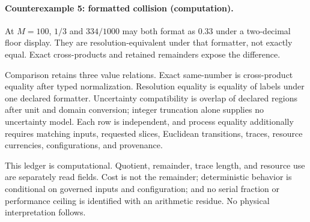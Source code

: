 \paragraph{Counterexample 5: formatted collision (computation).}
At \(M=100\), \(1/3\) and \(334/1000\) may both format as \(0.33\) under a two-decimal floor display.  They are
resolution-equivalent under that formatter, not exactly equal.  Exact cross-products and retained remainders expose
the difference.

Comparison retains three value relations.  Exact same-number is cross-product equality after typed normalization.
Resolution equality is equality of labels under one declared formatter.  Uncertainty compatibility is overlap of
declared regions after unit and domain conversion; integer truncation alone supplies no uncertainty model.  Each row
is independent, and process equality additionally requires matching inputs, requested slices, Euclidean transitions,
traces, resource currencies, configurations, and provenance.

This ledger is computational.  Quotient, remainder, trace length, and resource use are separately read fields.  Cost
is not the remainder; deterministic behavior is conditional on governed inputs and configuration; and no serial
fraction or performance ceiling is identified with an arithmetic residue.  No physical interpretation follows.
